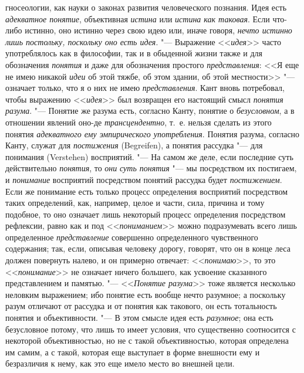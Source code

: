 {{{{гносеологии, как науки о законах развития человеческого
познания.\label{bkm:bm86}}}
Идея есть {\em адекватное понятие}, объективная
{\em истина} или
{\em истина как таковая}.
Если что-либо истинно, оно истинно через свою идею или, иначе
говоря, {\em нечто истинно лишь
постольку, поскольку оно есть идея}. "--- Выражение
<<{\em идея}>> часто
употреблялось как в философии, так и в обыденной жизни также и для
обозначения {\em понятия}
и даже для обозначения простого
{\em представления}: <<Я
еще не имею никакой {\em идеи}
об этой тяжбе, об этом здании, об этой местности>>
"--- означает только, что я о них не имею
{\em представления}. Кант
вновь потребовал, чтобы выражению
<<{\em идея}>> был
возвращен его настоящий смысл
{\em понятия разума}.
"--- Понятие же разума есть, согласно Канту, понятие о
{\em безусловном}, а в
отношении явлений оно-де
{\em трансцендентно},
т.~е. нельзя сделать из этого понятия
{\em адекватного ему эмпирического
употребления}. Понятия разума, согласно Канту, служат для
{\em постижения} (Begreifen),
а понятия рассудка "--- для понимания (Verstehen)
восприятий. "--- На самом же деле, если последние суть
действительно {\em понятия},
то {\em они}
{\em суть понятия} "--- мы
посредством их постигаем, и
{\em понимание}
восприятий посредством понятий рассудка будет
{\em постижением}. Если
же понимание есть только процесс определения восприятий посредством таких
определений, как, например, целое и части, сила, причина и тому подобное,
то оно означает лишь некоторый процесс определения посредством рефлексии,
равно как и под <<{\em пониманием}>>
можно подразумевать всего лишь определенное
{\em представление}
совершенно определенного чувственного содержания; так, если,
описывая человеку дорогу, говорят, что он в конце леса должен повернуть
налево, и он примерно отвечает:
<<{\em понимаю}>>, то это
<<{\em понимание}>> не
означает ничего большего, как усвоение сказанного представлением и
памятью. "--- <<{\em Понятие разума}>>
тоже является несколько неловким выражением; ибо понятие есть
вообще нечто разумное; а поскольку разум отличают от рассудка и от понятия
как такового, он есть тотальность понятия и объективности. "---
В этом смысле идея есть
{\em разумное}; она есть
безусловное потому, что лишь то имеет условия, что существенно соотносится
с некоторой объективностью, но не с такой объективностью, которая
определена им самим, а с такой, которая еще выступает в форме внешности ему
и безразличия к нему, как это еще имело место во внешней цели.

}}

